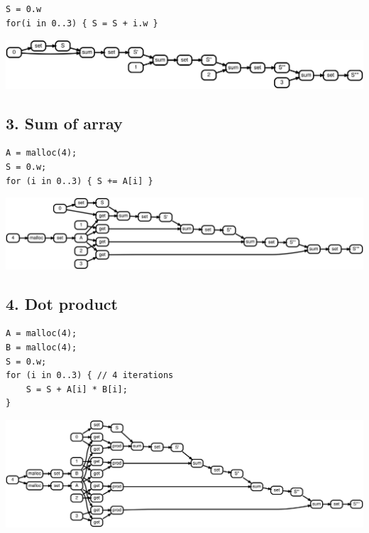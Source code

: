 \documentclass[sigplan,10pt,review,anonymous]{acmart}
\begin{document}
\begin{lstlisting}
S = 0.w
for(i in 0..3) { S = S + i.w }
\end{lstlisting}

\includegraphics[scale=0.1]{rtd42}

\subsection*{3. Sum of array}

\begin{lstlisting}
A = malloc(4);
S = 0.w;
for (i in 0..3) { S += A[i] }
\end{lstlisting}

\includegraphics[scale=0.1]{rtd43}

\subsection*{4. Dot product}

\begin{lstlisting}
A = malloc(4);
B = malloc(4);
S = 0.w;
for (i in 0..3) { // 4 iterations
    S = S + A[i] * B[i];
}
\end{lstlisting}

\includegraphics[scale=0.1]{rtd44}
\end{document}
